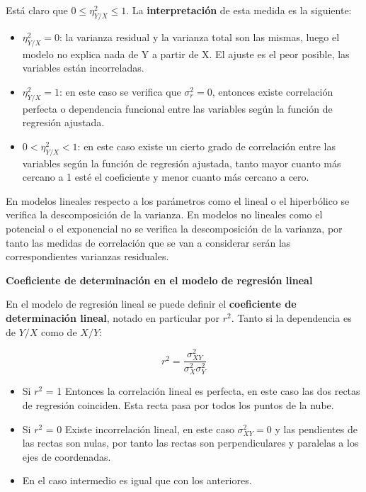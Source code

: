 \documentclass[10pt, a4paper]{article}
\theoremstyle{theorem-style}
\theoremstyle{definition-style}
\theoremstyle{remark-style}
\theoremstyle{example-style}
\theoremstyle{definition-style}
\theoremstyle{remark-style}
\begin{document}
	Está claro que $ 0 \leq \eta_{Y/X}^2 \leq 1 $. La \textbf{interpretación} de esta medida
	es la siguiente:

\begin{itemize}
	\item $ \eta_{Y/X}^2 = 0 $: la varianza residual y la varianza total son las
	mismas, luego el modelo no explica nada de Y a partir de X. El ajuste es el
	peor posible, las variables están incorreladas.

	\item $ \eta_{Y/X}^2 = 1 $: en este caso se verifica que $\sigma_r^2 = 0$, entonces
	existe correlación perfecta o dependencia funcional entre las variables según
	la función de regresión ajustada.

	\item $ 0 < \eta_{Y/X}^2 < 1 $: en este caso existe un cierto grado de correlación
	entre las variables según la función de regresión ajustada, tanto mayor
	cuanto más cercano a 1 esté el coeficiente y menor cuanto más cercano a
	cero.
\end{itemize}

En modelos lineales respecto a los parámetros como el lineal o el hiperbólico se
verifica la descomposición de la varianza. En modelos no lineales como el
potencial o el exponencial no se verifica la descomposición de la varianza, por
tanto las medidas de correlación que se van a considerar serán las
correspondientes varianzas residuales.

\vspace{5mm}
\textbf{Coeficiente de determinación en el modelo de regresión lineal}

En el modelo de regresión lineal se puede definir el \textbf{coeficiente de
determinación lineal}, notado en particular por $r^2$. Tanto si la dependencia es
de $Y/X$ como de $X/Y$:

$$ r^2 = \frac{\sigma_{XY}^2}{ \sigma_{X}^2 \sigma_{Y}^2 } $$

\begin{itemize}
\item Si $r^2$ = 1 Entonces la correlación lineal es perfecta, en este caso las dos
rectas de regresión coinciden. Esta recta pasa por todos los puntos de la nube.

\item Si $r^2$ = 0 Existe incorrelación lineal, en este caso $\sigma_{XY}^2 = 0$ y las
pendientes de las rectas son nulas, por tanto las rectas son perpendiculares y
paralelas a los ejes de coordenadas.

\item En el caso intermedio es igual que con los anteriores.
\end{itemize}
\end{document}
